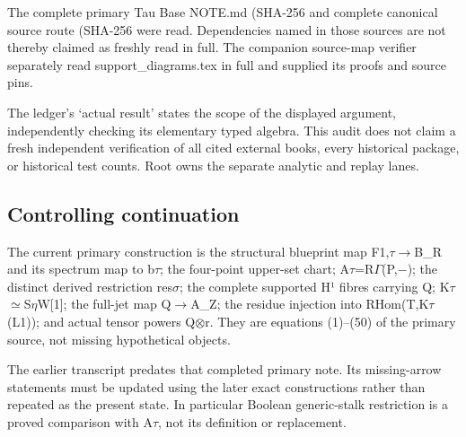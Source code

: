 The complete primary Tau Base NOTE.md (SHA-256
\protect{}
and complete canonical source route (SHA-256
\protect{}
were read. Dependencies named in those sources are not thereby claimed
as freshly read in full. The companion source-map verifier separately
read support\_diagrams.tex in full and supplied its proofs and source
pins.

The ledger's `actual result' states the scope of the displayed argument,
independently checking its elementary typed algebra. This audit does not
claim a fresh independent verification of all cited external books,
every historical package, or historical test counts. Root owns the
separate analytic and replay lanes.

\subsection{Controlling continuation}\label{TranscriptLedgerStage:controlling-continuation}

The current primary construction is the structural blueprint map
F1,\allowbreak{}\ensuremath{τ}\allowbreak{}\allowbreak{}\ensuremath{→}\allowbreak{}B\_R
and its spectrum map to b\allowbreak{}\ensuremath{τ}\allowbreak{}; the
four-point upper-set chart;
A\allowbreak{}\ensuremath{τ}\allowbreak{}=R\allowbreak{}\ensuremath{Γ}\allowbreak{}(P,\allowbreak{}\ensuremath{−}\allowbreak{});
the distinct derived restriction
res\allowbreak{}\ensuremath{σ}\allowbreak{}; the complete supported H¹
fibres carrying Q;
K\allowbreak{}\ensuremath{τ}\allowbreak{}\allowbreak{}\ensuremath{≃}\allowbreak{}S\allowbreak{}\ensuremath{η}\allowbreak{}W[1];
the full-jet map Q\allowbreak{}\ensuremath{→}\allowbreak{}A\_Z; the
residue injection into
RHom(T,K\allowbreak{}\ensuremath{τ}\allowbreak{}(L1)); and actual tensor
powers Q\allowbreak{}\ensuremath{⊗}\allowbreak{}r. They are equations
(1)--(50) of the primary source, not missing hypothetical objects.

The earlier transcript predates that completed primary note. Its
missing-arrow statements must be updated using the later exact
constructions rather than repeated as the present state. In particular
Boolean generic-stalk restriction is a proved comparison with
A\allowbreak{}\ensuremath{τ}\allowbreak{}, not its definition or
replacement.

